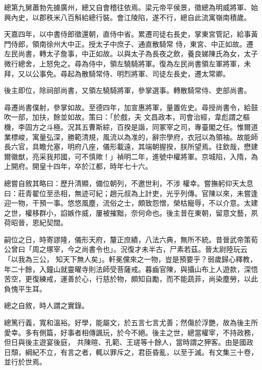 \begin{pinyinscope}
 總第九舅蕭勃先據廣州，總又自會稽往依焉。梁元帝平侯景，徵總為明威將軍、始興內史，以郡秩米八百斛給總行裝。會江陵陷，遂不行，總自此流寓嶺南積歲。



 天嘉四年，以中書侍郎徵還朝，直侍中省。累遷司徒右長史，掌東宮管記，給事黃門侍郎，領南徐州大中正。授太子中庶子、通直散騎常
 侍，東宮、中正如故。遷左民尚書，轉太子詹事，中正如故。以與太子為長夜之飲，養良娣陳氏為女，太子微行總舍，上怒免之。尋為侍中，領左驍騎將軍。復為左民尚書領左軍將軍，未拜，又以公事免。尋起為散騎常侍、明烈將軍、司徒左長史，遷太常卿。



 後主即位，除祠部尚書，又領左驍騎將軍，參掌選事。轉散騎常侍、吏部尚書。



 尋遷尚書僕射，參掌如故。至德四年，加宣惠將軍，量置佐史。尋授尚書令，給鼓吹一部，加扶，餘並如故。策曰：「於戲，夫
 文昌政本，司會治經，韋彪謂之樞機，李固方之斗極。況其五曹斯綜，百揆是諧，同冢宰之司，專臺閣之任。惟爾道業標峻，寓量弘深，勝範清規，風流以為准的，辭宗學府，衣冠以為領袖。故能師長六官，具瞻允塞，明府八座，儀形載遠，其端朝握揆，朕所望焉。往欽哉，懋建爾徽猷，亮采我邦國，可不慎歟！」禎明二年，進號中權將軍。京城陷，入隋，為上開府。開皇十四年，卒於江都，時年七十六。



 總嘗自敘其略曰：歷升清顯，備位朝列，不邀世利，不涉
 權幸。嘗撫躬仰天太息曰：莊青翟位至丞相，無迹可紀；趙元叔為上計吏，光乎列傳。官陳以來，未嘗逢迎一物，干預一事。悠悠風塵，流俗之士，頗致怨憎，榮枯寵辱，不以介意。太建之世，權移群小，諂嫉作威，屢被摧黜，奈何命也。後主昔在東朝，留意文藝，夙荷昭晉，恩紀契闊。



 嗣位之日，時寄謬隆，儀形天府，釐正庶績，八法六典，無所不統。昔晉武帝策荀公曾曰「周之塚宰，今之尚書令也」。況復才未半古，尸素若茲。晉太尉陸玩云「以我為三公，
 知天下無人矣」。軒冕儻來之一物，豈是預要乎？弱歲歸心釋教，年二十餘，入鐘山就靈曜寺則法師受菩薩戒。暮齒官陳，與攝山布上人遊款，深悟苦空，更復練戒，運善於心，行慈於物，頗知自勵，而不能蔬菲，尚染塵勞，以此負愧平生耳。



 總之自敘，時人謂之實錄。



 總篤行義，寬和溫裕。好學，能屬文，於五言七言尤善；然傷於浮艷，故為後主所愛幸。多有側篇，好事者相傳諷玩，於今不絕。後主之世，總當權宰，不持政務，但日與後主遊宴後庭，
 共陳暄、孔範、王瑳等十餘人，當時謂之狎客。由是國政日頹，綱紀不立，有言之者，輒以罪斥之，君臣昏亂，以至于滅。有文集三十卷，並行於世焉。




\end{pinyinscope}
